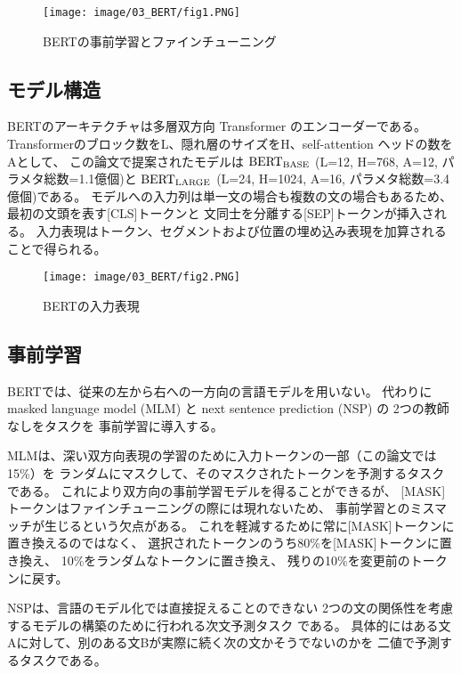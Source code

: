\documentclass{jsarticle}
\begin{document}
\begin{figure}[H]
  \begin{center}
    \texttt{[image: image/03\_BERT/fig1.PNG]}
    \caption{BERTの事前学習とファインチューニング}
    \label{fig:fig1}
  \end{center}
\end{figure}

\subsection{モデル構造}
BERTのアーキテクチャは多層双方向 Transformer のエンコーダーである。
Transformerのブロック数をL、隠れ層のサイズをH、self-attention ヘッドの数をAとして、
この論文で提案されたモデルは
$\rm BERT_{BASE}$ (L=12, H=768, A=12, パラメタ総数=1.1億個)と
$\rm BERT_{LARGE}$ (L=24, H=1024, A=16, パラメタ総数=3.4億個)である。
モデルへの入力列は単一文の場合も複数の文の場合もあるため、最初の文頭を表す[CLS]トークンと
文同士を分離する[SEP]トークンが挿入される。
入力表現はトークン、セグメントおよび位置の埋め込み表現を加算されることで得られる。

\begin{figure}[H]
  \begin{center}
    \texttt{[image: image/03\_BERT/fig2.PNG]}
    \caption{BERTの入力表現}
    \label{fig:fig2}
  \end{center}
\end{figure}


\subsection{事前学習}
BERTでは、従来の左から右への一方向の言語モデルを用いない。
代わりに
masked language model (MLM) と next sentence prediction (NSP) の
2つの教師なしをタスクを
事前学習に導入する。

MLMは、深い双方向表現の学習のために入力トークンの一部（この論文では15\%）を
ランダムにマスクして、そのマスクされたトークンを予測するタスクである。
これにより双方向の事前学習モデルを得ることができるが、
[MASK]トークンはファインチューニングの際には現れないため、
事前学習とのミスマッチが生じるという欠点がある。
これを軽減するために常に[MASK]トークンに置き換えるのではなく、
選択されたトークンのうち80\%を[MASK]トークンに置き換え、
10\%をランダムなトークンに置き換え、
残りの10\%を変更前のトークンに戻す。

NSPは、言語のモデル化では直接捉えることのできない
2つの文の関係性を考慮するモデルの構築のために行われる次文予測タスク
である。
具体的にはある文Aに対して、別のある文Bが実際に続く次の文かそうでないのかを
二値で予測するタスクである。
\end{document}
